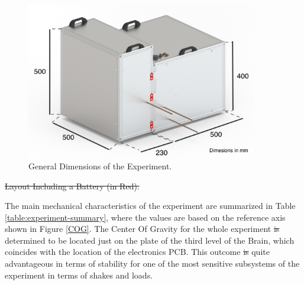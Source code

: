 \documentclass[a4paper,12pt,oneside]{article}
\providecommand{\DIFaddtex}[1]{{\protect\color{blue}\uwave{#1}}} %
\providecommand{\DIFdeltex}[1]{{\protect\color{red}\sout{#1}}}                      %
\providecommand{\DIFaddbegin}{} %
\providecommand{\DIFaddend}{} %
\providecommand{\DIFdelbegin}{} %
\providecommand{\DIFdelend}{} %
\providecommand{\DIFdelFL}[1]{\DIFdel{#1}} %
\providecommand{\DIFadd}[1]{\texorpdfstring{\DIFaddtex{#1}}{#1}} %
\providecommand{\DIFdel}[1]{\texorpdfstring{\DIFdeltex{#1}}{}} %
\newcommand{\DIFscaledelfig}{0.5}
\newlength{\DIFdelgraphicswidth} %
\newlength{\DIFdelgraphicsheight} %
\newcommand{\DIFaddincludegraphics}[2][]{{\color{blue}\fbox{\DIFOincludegraphics[#1]{#2}}}} %
\newcommand{\DIFdelincludegraphics}[2][]{%
\sbox{\DIFdelgraphicsbox}{\DIFOincludegraphics[#1]{#2}}%
\settoboxwidth{\DIFdelgraphicswidth}{\DIFdelgraphicsbox} %
\settoboxtotalheight{\DIFdelgraphicsheight}{\DIFdelgraphicsbox} %
\scalebox{\DIFscaledelfig}{%
\parbox[b]{\DIFdelgraphicswidth}{\usebox{\DIFdelgraphicsbox}\\[-\baselineskip] \rule{\DIFdelgraphicswidth}{0em}}\llap{\resizebox{\DIFdelgraphicswidth}{\DIFdelgraphicsheight}{%
\setlength{\unitlength}{\DIFdelgraphicswidth}%
\begin{picture}(1,1)%
\thicklines\linethickness{2pt} %
{\color[rgb]{1,0,0}\put(0,0){\framebox(1,1){}}}%
{\color[rgb]{1,0,0}\put(0,0){\line( 1,1){1}}}%
{\color[rgb]{1,0,0}\put(0,1){\line(1,-1){1}}}%
\end{picture}%
}\hspace*{3pt}}} %
} %
\DeclareRobustCommand{\DIFaddbegin}{\DIFOaddbegin \let\includegraphics\DIFaddincludegraphics} %
\DeclareRobustCommand{\DIFaddend}{\DIFOaddend \let\includegraphics\DIFOincludegraphics} %
\DeclareRobustCommand{\DIFdelbegin}{\DIFOdelbegin \let\includegraphics\DIFdelincludegraphics} %
\DeclareRobustCommand{\DIFdelend}{\DIFOaddend \let\includegraphics\DIFOincludegraphics} %
\begin{document}
 \begin{figure}[H]
     \centering
     \includegraphics[width=0.9\textwidth]{4-experiment-design/img/Mechanical/Figure_14.png}
     \caption{General Dimensions of the Experiment.}
     \label{dimensions}
\end{figure}



\DIFdelbegin %
{%
\DIFdelFL{Layout Including a Battery (in Red).}}

\DIFdelend The main mechanical characteristics of the experiment are summarized in Table \ref{table:experiment-summary}, where the values are based on the reference axis shown in Figure \ref{COG}. The Center Of Gravity for the whole experiment \DIFdelbegin \DIFdel{is }\DIFdelend \DIFaddbegin \DIFadd{was }\DIFaddend determined to be located just on the plate of the third level of the Brain, which coincides with the location of the electronics PCB. This outcome \DIFdelbegin \DIFdel{is }\DIFdelend \DIFaddbegin \DIFadd{was }\DIFaddend quite advantageous in terms of stability for one of the most sensitive subsystems of the experiment in terms of shakes and loads. 
\end{document}
